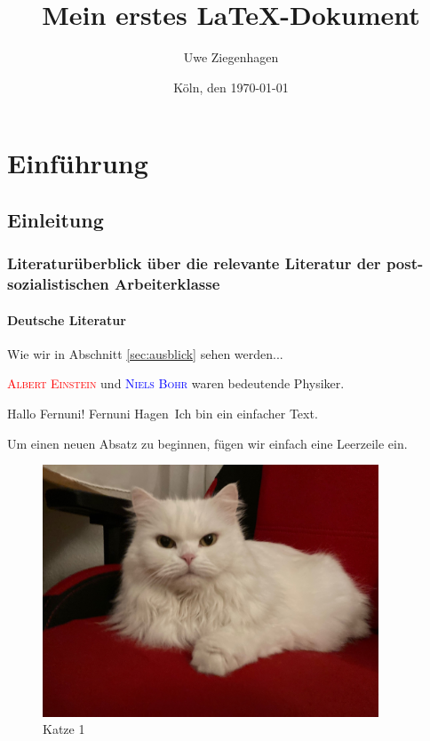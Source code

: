 \documentclass[12pt,ngerman,parskip=half]{scrreport}
\author{Uwe Ziegenhagen}
\title{Mein erstes LaTeX-Dokument}
\date{Köln, den \today} %
\newcommand{\person}[1]{\textcolor{blue}{\textsc{#1}}}
\newcommand{\fuh}{Fernuni Hagen}
\begin{document}
\maketitle

\tableofcontents

\listoffigures

\listoftables


\chapter{Einführung}

\section{Einleitung}
\subsection[Literaturüberblick über die relevante Literatur]{Literaturüberblick über die relevante Literatur der post-sozialistischen Arbeiterklasse}
\subsubsection{Deutsche Literatur}

Wie wir in Abschnitt \ref{sec:ausblick} sehen werden...

\textcolor{red}{\textsc{Albert Einstein}} und \person{Niels Bohr} waren bedeutende Physiker.

Hallo Fernuni! \fuh\ Ich bin ein einfacher Text.

Um einen neuen Absatz zu beginnen, fügen wir einfach eine Leerzeile ein.



\begin{figure}[b] %
\begin{center}
\includegraphics[width=10cm]{Bilder/Katze}
\end{center}
\caption{Katze 1}\label{fig:katze}
\end{figure}
\end{document}
